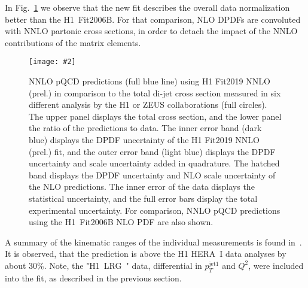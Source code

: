 \documentclass{PoS}
\makeatletter
\newcommand{\includegraphicss}[2][]{\texttt{[image: \#2]}}
\newcommand*{\rom}[1]{\expandafter\@slowromancap\romannumeral #1@}
\newcommand{\HERAII} {\protect\scalebox{0.8}{(HERA~\rom{2})}}
\newcommand{\HLRG}  {H1~LRG~\HERAII\xspace}
\makeatother
\begin{document}
In Fig.~\ref{figTotalXsecs} we observe that the new fit describes the overall data normalization better than the H1~Fit2006B. For that comparison, NLO DPDFs are convoluted with NNLO partonic cross sections, in order to detach the impact of the NNLO contributions of the matrix elements.
%
\begin{figure}[tbh]
\centering
\includegraphicss[trim={0cm 1.7cm 0 0.7cm},clip,width=.6\textwidth]{{{plots/H1prelim-19-013.fig3}}}
\caption{ NNLO pQCD predictions (full blue line) using H1 Fit2019 NNLO (prel.) in comparison to the total di-jet cross section measured in six different analysis by the H1 or ZEUS collaborations (full circles). The upper panel displays the total cross section, and the lower panel the ratio of the predictions to data. The inner error band (dark blue) displays the DPDF uncertainty of the H1 Fit2019 NNLO (prel.) fit, and the outer error band (light blue) displays the DPDF uncertainty and scale uncertainty added in quadrature. The hatched band displays the DPDF uncertainty and NLO scale uncertainty of the NLO predictions. The inner error of the data displays the statistical uncertainty, and the full error bars display the total experimental uncertainty. For comparison, NNLO pQCD predictions using the H1~Fit2006B NLO PDF are also shown.}
\label{figTotalXsecs}
\end{figure}
%
A summary of the kinematic ranges of the individual measurements is found in~\cite{Britzger:2018zvv}.
It is observed, that the prediction is above the H1 HERA~I data analyses by about 30\%.
Note, the "\HLRG" data, differential in $p_T^{\mathrm{jet}1}$ and $Q^2$, were included into the fit, as described in the previous section.
\end{document}
